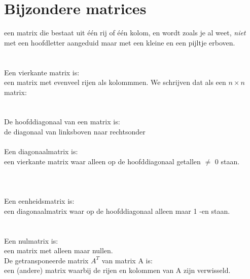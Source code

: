 \section{Bijzondere matrices}
{een matrix die bestaat uit één rij of één  kolom, en wordt zoals je al weet, \textit{niet} met een hoofdletter aangeduid maar met een kleine en een pijltje erboven.}\\
\\ \\
{Een vierkante matrix is:
	\\een matrix met evenveel rijen als kolommmen. We schrijven dat als een $ n \times n $ matrix:} 
  \\ \\ \\
{De hoofddiagonaal van een matrix is:
	\\de diagonaal van linksboven naar rechtsonder}
\\ \\ 
{Een diagonaalmatrix is:\\een vierkante matrix waar alleen op de hoofddiagonaal getallen $\ne$ 0 staan. }
\\ \\ \\ \\
{Een eenheidsmatrix  is:\\een diagonaalmatrix waar  op de hoofddiagonaal alleen maar 1 -en  staan. }
\\ \\ \\
{Een nulmatrix  is: \\een matrix met alleen maar nullen. }
 \\ 
{De getransponeerde matrix $ A^{T}  $ van matrix A is:\\
	een (andere) matrix waarbij de rijen en kolommen van A zijn verwisseld. } 
 \\ \\ \\ \\
\\
